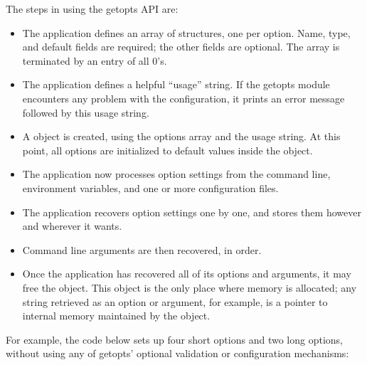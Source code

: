 The steps in using the getopts API are:

\begin{itemize}
\item The application defines an array of 
      structures, one per option. Name, type, and default fields are
      required; the other fields are optional.  The array is
      terminated by an entry of all 0's.

\item The application defines a helpful ``usage'' string. If the getopts
      module encounters any problem with the configuration, it prints
      an error message followed by this usage string.

\item A  object is created, using the options
      array and the usage string. At this point, all options are 
      initialized to default values inside the object.

\item The application now processes option settings from the command
      line, environment variables, and one or more configuration
      files. 
 
\item The application recovers option settings one by one, and stores
      them however and wherever it wants. 

\item Command line arguments are then recovered, in order.

\item Once the application has recovered all of its options and
      arguments, it may free the  object. This 
      object is the only place where memory is allocated; any string
      retrieved as an option or argument, for example, is a pointer
      to internal memory maintained by the object.
\end{itemize}

For example, the code below sets up four short options and two long
options, without using any of getopts' optional validation or
configuration mechanisms:

